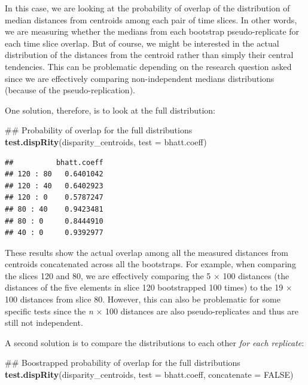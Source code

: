 \documentclass[]{book}
\newenvironment{Shaded}{\begin{snugshade}}{\end{snugshade}}
\newcommand{\KeywordTok}[1]{\textcolor[rgb]{0.13,0.29,0.53}{\textbf{#1}}}
\newcommand{\DataTypeTok}[1]{\textcolor[rgb]{0.13,0.29,0.53}{#1}}
\newcommand{\OtherTok}[1]{\textcolor[rgb]{0.56,0.35,0.01}{#1}}
\newcommand{\NormalTok}[1]{#1}
\theoremstyle{definition}
\theoremstyle{definition}
\theoremstyle{remark}
\begin{document}
In this case, we are looking at the probability of overlap of the
distribution of median distances from centroids among each pair of time
slices. In other words, we are measuring whether the medians from each
bootstrap pseudo-replicate for each time slice overlap. But of course,
we might be interested in the actual distribution of the distances from
the centroid rather than simply their central tendencies. This can be
problematic depending on the research question asked since we are
effectively comparing non-independent medians distributions (because of
the pseudo-replication).

One solution, therefore, is to look at the full distribution:

\begin{Shaded}
\begin{Highlighting}[]
\NormalTok{## Probability of overlap for the full distributions}
\KeywordTok{test.dispRity}\NormalTok{(disparity_centroids, }\DataTypeTok{test =}\NormalTok{ bhatt.coeff)}
\end{Highlighting}
\end{Shaded}

\begin{verbatim}
##          bhatt.coeff
## 120 : 80   0.6401042
## 120 : 40   0.6402923
## 120 : 0    0.5787247
## 80 : 40    0.9423481
## 80 : 0     0.8444910
## 40 : 0     0.9392977
\end{verbatim}

These results show the actual overlap among all the measured distances
from centroids concatenated across all the bootstraps. For example, when
comparing the slices 120 and 80, we are effectively comparing the 5
\(\times\) 100 distances (the distances of the five elements in slice
120 bootstrapped 100 times) to the 19 \(\times\) 100 distances from
slice 80. However, this can also be problematic for some specific tests
since the \emph{n} \(\times\) 100 distances are also pseudo-replicates
and thus are still not independent.

A second solution is to compare the distributions to each other
\emph{for each replicate}:

\begin{Shaded}
\begin{Highlighting}[]
\NormalTok{## Boostrapped probability of overlap for the full distributions}
\KeywordTok{test.dispRity}\NormalTok{(disparity_centroids, }\DataTypeTok{test =}\NormalTok{ bhatt.coeff, }\DataTypeTok{concatenate =} \OtherTok{FALSE}\NormalTok{)}
\end{Highlighting}
\end{Shaded}
\end{document}

